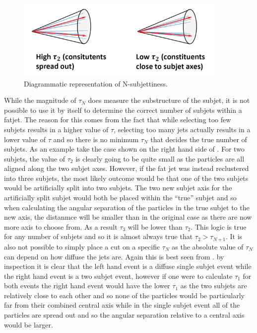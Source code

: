 \begin{figure}
  \centering
  \includegraphics[width=0.9\textwidth]{TopAnalysis/figures/nsubjettiness.png}
  \caption[Diagrammatic representation of N-subjettiness]{Diagrammatic representation of N-subjettiness.}
  \label{fig:nsubjet}
\end{figure}

While the magnitude of $\tau_N$ does measure the substructure of the subjet, it is not possible to use it by itself to determine the correct number of subjets within a fatjet. The reason for this comes from the fact that while selecting too few subjets results in a higher value of $\tau$, selecting too many jets actually results in a lower value of $\tau$ and so there is no minimum $\tau_N$ that decides the true number of subjets. As an example take the case shown on the right hand side of . For two subjets, the value of $\tau_2$ is clearly going to be quite small as the particles are all aligned along the two subjet axes. However, if the fat jet was instead reclustered into three subjets, the most likely outcome would be that one of the two subjets would be artificially split into two subjets. The two new subjet axis for the artificially split subjet would both be placed within the ``true'' subjet and so when calculating the angular separation of the particles in the true subjet to the new axis, the distanmce will be smaller than in the original case as there are now more axis to choose from. As a result $\tau_3$ will be lower than $\tau_2$. This logic is true for any number of subjets and so it is almost always true that $\tau_2 > \tau_{N+1}$. It is also not possible to simply place a cut on a specific $\tau_N$ as the absolute value of $\tau_N$ can depend on how diffuse the jets are. Again this is best seen from . by inspection it is clear that the left hand event is a diffuse single subjet event while the right hand event is a two subjet event, however if one were to calculate $\tau_1$ for both events the right hand event would have the lower $\tau_1$ as the two subjets are relatively close to each other and so none of the particles would be particularly far from their combined central axis while in the single subjet event all of the particles are spread out and so the angular separation relative to a central axis would be larger.


